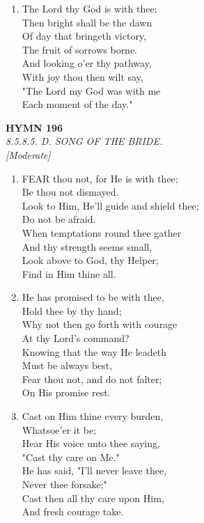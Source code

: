 \documentclass[11pt,a4paper]{article}
\begin{document}
\begin{enumerate}
    \item The Lord thy God is with thee; \\
        Then bright shall be the dawn \\
        Of day that bringeth victory, \\
        The fruit of sorrows borne. \\
        And looking o'er thy pathway, \\
        With joy thou then wilt say, \\
        "The Lord my God was with me \\
        Each moment of the day."

\end{enumerate}

\newpage
\begin{center}
    {\Large \textbf{HYMN 196}}
    \\
    \textit{8.5.8.5. D. SONG OF THE BRIDE.}
    \\
    \textit{\small [Moderate]}
\end{center}
\vspace{1em}

\begin{enumerate}
    \item FEAR thou not, for He is with thee; \\
        Be thou not dismayed. \\
        Look to Him, He'll guide and shield thee; \\
        Do not be afraid. \\
        When temptations round thee gather \\
        And thy strength seems small, \\
        Look above to God, thy Helper; \\
        Find in Him thine all.

    \item He has promised to be with thee, \\
        Hold thee by thy hand; \\
        Why not then go forth with courage \\
        At thy Lord's command? \\
        Knowing that the way He leadeth \\
        Must be always best, \\
        Fear thou not, and do not falter; \\
        On His promise rest.

    \item Cast on Him thine every burden, \\
        Whatsoe'er it be; \\
        Hear His voice unto thee saying, \\
        "Cast thy care on Me." \\
        He has said, "I'll never leave thee, \\
        Never thee forsake;" \\
        Cast then all thy care upon Him, \\
        And fresh courage take.

\end{enumerate}
\end{document}
